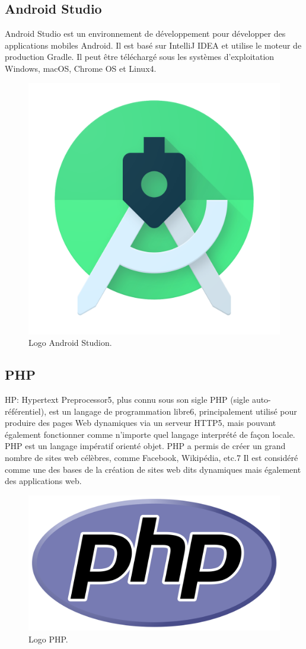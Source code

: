 \documentclass[12pt,a4paper]{report}
\begin{document}
\subsection{Android Studio}
Android Studio est un environnement de développement pour développer des applications mobiles Android. Il est basé sur IntelliJ IDEA et utilise le moteur de production Gradle. Il peut être téléchargé sous les systèmes d'exploitation Windows, macOS, Chrome OS et Linux4.
	\begin{figure}[H]
	\centering
	\includegraphics[width=0.3\linewidth]{android}
	\caption{Logo Android Studion.}
	
\end{figure}

\subsection{PHP}
HP: Hypertext Preprocessor5, plus connu sous son sigle PHP (sigle auto-référentiel), est un langage de programmation libre6, principalement utilisé pour produire des pages Web dynamiques via un serveur HTTP5, mais pouvant également fonctionner comme n'importe quel langage interprété de façon locale. PHP est un langage impératif orienté objet.
PHP a permis de créer un grand nombre de sites web célèbres, comme Facebook, Wikipédia, etc.7 Il est considéré comme une des bases de la création de sites web dits dynamiques mais également des applications web.
\begin{figure}[H]
	\centering
	\includegraphics[width=0.3\linewidth]{php}
	\caption{Logo PHP.}
	
\end{figure}
\end{document}
